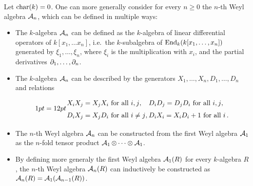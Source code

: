 \begin{remark}
  Let $\operatorname{char}(k) = 0$.
  One can more generally consider for every $n \geq 0$ the $n$-th Weyl algebra $\operatorname{\mathcal{A}}_n$, which can be defined in multiple ways:
  \begin{itemize}
    \item
      The $k$-algebra $\operatorname{\mathcal{A}}_n$ can be defined as the $k$-algebra of linear differential operators of $k[x_1, \dotsc x_n]$, i.e.\ the $k$-subalgebra of $\operatorname{End}_k(k[x_1, \dotsc, x_n])$ generated by $\xi_1, \dotsc, \xi_n$, where $\xi_i$ is the multiplication with $x_i$, and the partial derivatives $\partial_1, \dotsc, \partial_n$.
    \item
      The $k$-algebra $\operatorname{\mathcal{A}}_n$ can be described by the generators $X_1, \dotsc, X_n, D_1, \dotsc, D_n$ and relations
      \[
        \begingroup
        \arraycolsep = 12pt
        \renewcommand{\arraystretch}{1.5}
        \begin{array}{ll}
            \text{$X_i X_j = X_j X_i$ for all $i,j$},
          & \text{$D_i D_j = D_j D_i$ for all $i, j$},
          \\
            \text{$D_i X_j = X_j D_i$ for all $i \neq j$},
          & \text{$D_i X_i = X_i D_i + 1$ for all $i$} \,.
        \end{array}
        \endgroup
      \]
    \item
      The $n$-th Weyl algebra $\operatorname{\mathcal{A}}_n$ can be constructed from the first Weyl algebra $\operatorname{\mathcal{A}}_1$ as the $n$-fold tensor product $\operatorname{\mathcal{A}}_1 \mathbin{\otimes} \dotsb \mathbin{\otimes} \operatorname{\mathcal{A}}_1$.
    \item
      By defining more generaly the first Weyl algebra $\operatorname{\mathcal{A}}_1(R)$ for every $k$-algebra $R$, the $n$-th Weyl algebra $\operatorname{\mathcal{A}}_n(R)$ can inductively be constructed as $\operatorname{\mathcal{A}}_n(R) = \operatorname{\mathcal{A}}_1(\operatorname{\mathcal{A}}_{n-1}(R))$.
  \end{itemize}
\end{remark}




